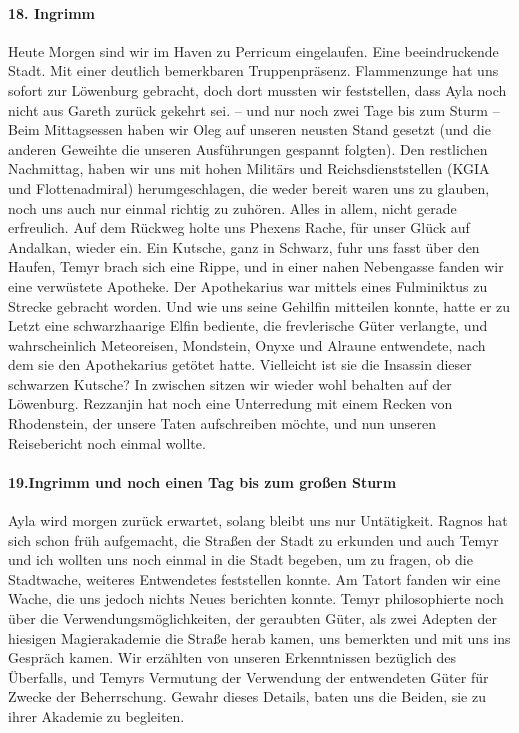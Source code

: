 \paragraph{18. Ingrimm}
Heute Morgen sind wir im Haven zu Perricum eingelaufen. Eine beeindruckende Stadt. Mit einer deutlich bemerkbaren Truppenpräsenz.
Flammenzunge hat uns sofort zur Löwenburg gebracht, doch dort mussten wir feststellen, dass Ayla noch nicht aus Gareth zurück gekehrt sei. -- und nur noch zwei Tage bis zum Sturm -- Beim Mittagsessen haben wir Oleg auf unseren neusten Stand gesetzt (und die anderen Geweihte die unseren Ausführungen gespannt folgten). Den restlichen Nachmittag, haben wir uns mit hohen Militärs und Reichsdienststellen (KGIA und Flottenadmiral) herumgeschlagen, die weder bereit waren uns zu glauben, noch uns auch nur einmal richtig zu zuhören. Alles in allem, nicht gerade erfreulich. Auf dem Rückweg holte uns Phexens Rache, für unser Glück auf Andalkan, wieder ein. Ein Kutsche, ganz in Schwarz, fuhr uns fasst über den Haufen, Temyr brach sich eine Rippe, und in einer nahen Nebengasse fanden wir eine verwüstete Apotheke. Der Apothekarius war mittels eines Fulminiktus zu Strecke gebracht worden. Und wie uns seine Gehilfin mitteilen konnte, hatte er zu Letzt eine schwarzhaarige Elfin bediente, die frevlerische Güter verlangte, und wahrscheinlich Meteoreisen, Mondstein, Onyxe und Alraune entwendete, nach dem sie den Apothekarius getötet hatte. Vielleicht ist sie die Insassin dieser schwarzen Kutsche? In zwischen sitzen wir wieder wohl behalten auf der Löwenburg. Rezzanjin hat noch eine Unterredung mit einem Recken von Rhodenstein, der unsere Taten aufschreiben möchte, und nun unseren Reisebericht noch einmal wollte.


\paragraph{19.Ingrimm und noch einen Tag bis zum großen Sturm}
Ayla wird morgen zurück erwartet, solang bleibt uns nur Untätigkeit. Ragnos hat sich schon früh aufgemacht, die Straßen der Stadt zu erkunden und auch Temyr und ich wollten uns noch einmal in die Stadt begeben, um zu fragen, ob die Stadtwache, weiteres Entwendetes feststellen konnte. Am Tatort fanden wir eine Wache, die uns jedoch nichts Neues berichten konnte. Temyr philosophierte noch über die Verwendungsmöglichkeiten, der geraubten Güter, als zwei Adepten der hiesigen Magierakademie die Straße herab kamen, uns bemerkten und mit uns ins Gespräch kamen. Wir erzählten von unseren Erkenntnissen bezüglich des Überfalls, und Temyrs Vermutung der Verwendung der entwendeten Güter für Zwecke der Beherrschung. Gewahr dieses Details, baten uns die Beiden, sie zu ihrer Akademie zu begleiten.


